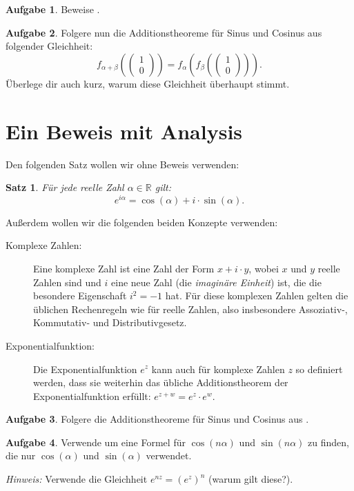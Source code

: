 \documentclass[a4paper,ngerman,12pt]{scrartcl}
\newcommand{\IR}{\mathbb{R}}
\theoremstyle{definition}
\newtheorem{aufg}{Aufgabe}
\theoremstyle{plain}
\newtheorem{satz}[defn]{Satz}
\theoremstyle{remark}
\begin{document}
\begin{aufg}
	Beweise .
\end{aufg}

\begin{aufg}
	Folgere nun die Additionstheoreme für Sinus und Cosinus aus folgender Gleichheit:
		\[f_{\alpha+\beta}\left(\begin{pmatrix}1 \\ 0\end{pmatrix}\right) = f_\alpha\left(f_\beta\left(\begin{pmatrix}1 \\ 0\end{pmatrix}\right)\right).\]
	Überlege dir auch kurz, warum diese Gleichheit überhaupt stimmt.
\end{aufg}
	
	
	
\section{Ein Beweis mit Analysis}

Den folgenden Satz wollen wir ohne Beweis verwenden:

\begin{satz}\label{satz:ExpSinCos}
 	Für jede reelle Zahl $\alpha \in \IR$ gilt:
 		\[e^{i\alpha} = \cos(\alpha) + i\cdot\sin(\alpha).\]
\end{satz}

Außerdem wollen wir die folgenden beiden Konzepte verwenden:
\begin{description}
	\item[Komplexe Zahlen:] Eine komplexe Zahl ist eine Zahl der Form $x+i\cdot y$, wobei $x$ und $y$ reelle Zahlen sind und $i$ eine neue Zahl (die \emph{imaginäre Einheit}) ist, die die besondere Eigenschaft $i^2 = -1$ hat. Für diese komplexen Zahlen gelten die üblichen Rechenregeln wie für reelle Zahlen, also insbesondere Assoziativ-, Kommutativ- und Distributivgesetz.
	\item[Exponentialfunktion:] Die Exponentialfunktion $e^z$ kann auch für komplexe Zahlen $z$ so definiert werden, dass sie weiterhin das übliche Additionstheorem der Exponentialfunktion erfüllt: $e^{z+w} = e^z \cdot e^w$.
\end{description}

\begin{aufg}
	Folgere die Additionstheoreme für Sinus und Cosinus aus .
\end{aufg}

\begin{aufg}
	Verwende  um eine Formel für $\cos(n\alpha)$ und $\sin(n\alpha)$ zu finden, die nur $\cos(\alpha)$ und $\sin(\alpha)$ verwendet.

	\textit{Hinweis:} Verwende die Gleichheit $e^{nz} = (e^z)^n$ (warum gilt diese?).
\end{aufg}
\end{document}
